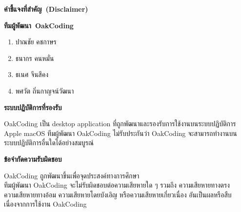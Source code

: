 \begin{titlepage}
\maketitle
\thispagestyle{empty}
\vspace{1ex}


\mbox{\LARGE \textbf{คำชี้แจงที่สำคัญ (Disclaimer)}}

\rule{0em}{3ex}

\mbox{\large \textbf{ทีมผู้พัฒนา OakCoding}}

\rule{0em}{1ex}

\begin{enumerate}[topsep = 0pt, itemsep = 0.6pt]
    \item ปาณชัย คชกาษร
    \item ธนากร คนหมั่น
    \item ธเนศ จีนสีคง
    \item พศวัต ถิ่นกาญจน์วัฒนา
\end{enumerate}

\rule{0em}{3ex}

\mbox{\large \textbf{ระบบปฏิบัติการที่รองรับ}}

\rule{0em}{1ex}

OakCoding เป็น desktop application ที่ถูกพัฒนาและรองรับการใช้งานบนระบบปฏิบัติการ Apple macOS
ทีมผู้พัฒนา OakCoding ไม่รับประกันว่า OakCoding จะสามารถทำงานบนระบบปฏิบัติการอื่นใดได้อย่างสมบูรณ์

\rule{0em}{3ex}

\mbox{\large \textbf{ข้อจำกัดความรับผิดชอบ}}

\rule{0em}{1ex}

OakCoding ถูกพัฒนาขึ้นเพื่อจุดประสงค์ทางการศึกษา\\
ทีมผู้พัฒนา OakCoding จะไม่รับผิดชอบต่อความเสียหายใด ๆ รวมถึง ความเสียหายทางตรง\\
ความเสียหายทางอ้อม ความเสียหายโดยบังเอิญ หรือความเสียหายเกี่ยวเนื่อง อันเป็นผลหรือสืบเนื่องจากการใช้งาน OakCoding
\end{titlepage}

